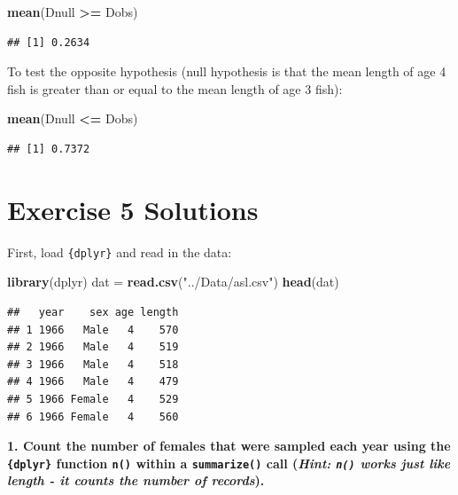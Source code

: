 \documentclass[]{book}
\newenvironment{Shaded}{\begin{snugshade}}{\end{snugshade}}
\newcommand{\KeywordTok}[1]{\textcolor[rgb]{0.13,0.29,0.53}{\textbf{#1}}}
\newcommand{\NormalTok}[1]{#1}
\newcommand{\OperatorTok}[1]{\textcolor[rgb]{0.81,0.36,0.00}{\textbf{#1}}}
\newcommand{\StringTok}[1]{\textcolor[rgb]{0.31,0.60,0.02}{#1}}
\begin{document}
\begin{Shaded}
\begin{Highlighting}[]
\KeywordTok{mean}\NormalTok{(Dnull }\OperatorTok{>=}\StringTok{ }\NormalTok{Dobs)}
\end{Highlighting}
\end{Shaded}

\begin{verbatim}
## [1] 0.2634
\end{verbatim}

To test the opposite hypothesis (null hypothesis is that the mean length of age 4 fish is greater than or equal to the mean length of age 3 fish):

\begin{Shaded}
\begin{Highlighting}[]
\KeywordTok{mean}\NormalTok{(Dnull }\OperatorTok{<=}\StringTok{ }\NormalTok{Dobs)}
\end{Highlighting}
\end{Shaded}

\begin{verbatim}
## [1] 0.7372
\end{verbatim}

\hypertarget{ex5-answers}{%
\section*{Exercise 5 Solutions}\label{ex5-answers}}

First, load \texttt{\{dplyr\}} and read in the data:

\begin{Shaded}
\begin{Highlighting}[]
\KeywordTok{library}\NormalTok{(dplyr)}
\NormalTok{dat =}\StringTok{ }\KeywordTok{read.csv}\NormalTok{(}\StringTok{"../Data/asl.csv"}\NormalTok{)}
\KeywordTok{head}\NormalTok{(dat)}
\end{Highlighting}
\end{Shaded}

\begin{verbatim}
##   year    sex age length
## 1 1966   Male   4    570
## 2 1966   Male   4    519
## 3 1966   Male   4    518
## 4 1966   Male   4    479
## 5 1966 Female   4    529
## 6 1966 Female   4    560
\end{verbatim}

\textbf{1. Count the number of females that were sampled each year using the \texttt{\{dplyr\}} function \texttt{n()} within a \texttt{summarize()} call (\emph{Hint: \texttt{n()} works just like length - it counts the number of records}).}
\end{document}
